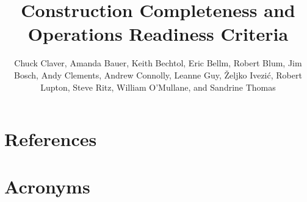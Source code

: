 \documentclass[SE,authoryear,toc]{lsstdoc}
\title{Construction Completeness and Operations Readiness Criteria}
\author{%
Chuck Claver,
Amanda Bauer,
Keith Bechtol,
Eric Bellm,
Robert Blum,
Jim Bosch,
Andy Clements,
Andrew Connolly,
Leanne Guy,
\v{Z}eljko Ivezi\'{c},
Robert Lupton,
Steve Ritz,
William O'Mullane, and
Sandrine Thomas
}
\date{\vcsDate}
\begin{document}
\maketitle















\pagebreak

\appendix
\section{References} \label{sec:bib}
\renewcommand{\refname}{} %


\pagebreak

\section{Acronyms} \label{sec:acronyms}

\end{document}
